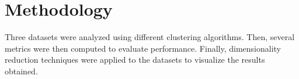 \section{Methodology}
Three datasets were analyzed using different clustering algorithms. Then, several metrics were then computed to evaluate 
performance. Finally, dimensionality reduction techniques were applied to the datasets to visualize the results obtained.









